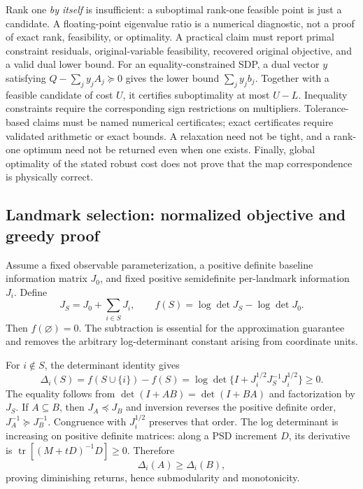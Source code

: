 \documentclass[11pt,a4paper]{article}
\numberwithin{equation}{section}
\begin{document}
Rank one \emph{by itself} is insufficient: a suboptimal rank-one feasible
point is just a candidate. A floating-point eigenvalue ratio is a
numerical diagnostic, not a proof of exact rank, feasibility, or
optimality. A practical claim must report primal constraint residuals,
original-variable feasibility, recovered original objective, and a
valid dual lower bound. For an equality-constrained SDP, a dual vector
$y$ satisfying $Q-\sum_j y_jA_j\succeq0$ gives the lower bound
$\sum_jy_jb_j$. Together with a feasible candidate of cost $U$, it
certifies suboptimality at most $U-L$. Inequality constraints require
the corresponding sign restrictions on multipliers. Tolerance-based
claims must be named numerical certificates; exact certificates require
validated arithmetic or exact bounds. A relaxation need not be tight,
and a rank-one optimum need not be returned even when one exists.
Finally, global optimality of the stated robust cost does not prove
that the map correspondence is physically correct.

\subsection{Landmark selection: normalized objective and greedy proof}

Assume a fixed observable parameterization, a positive definite baseline
information matrix $J_0$, and fixed positive semidefinite per-landmark
information $J_i$. Define
\begin{equation}
 J_S=J_0+\sum_{i\in S}J_i,\qquad
 f(S)=\log\det J_S-\log\det J_0.
 \label{eq:normalized-information}
\end{equation}
Then $f(\varnothing)=0$. The subtraction is essential for the
approximation guarantee and removes the arbitrary log-determinant
constant arising from coordinate units.

For $i\notin S$, the determinant identity gives
\begin{equation}
 \Delta_i(S)=f(S\cup\{i\})-f(S)
 =\log\det\{I+J_i^{1/2}J_S^{-1}J_i^{1/2}\}\geq0.
\end{equation}
The equality follows from $\det(I+AB)=\det(I+BA)$ and factorization by
$J_S$. If $A\subseteq B$, then $J_A\preceq J_B$ and inversion reverses
the positive definite order, $J_A^{-1}\succeq J_B^{-1}$.
Congruence with $J_i^{1/2}$ preserves that order. The log determinant
is increasing on positive definite matrices: along a PSD increment
$D$, its derivative is $\operatorname{tr}[(M+tD)^{-1}D]\geq0$.
Therefore
\begin{equation}
 \Delta_i(A)\geq\Delta_i(B),
\end{equation}
proving diminishing returns, hence submodularity and monotonicity.
\end{document}
